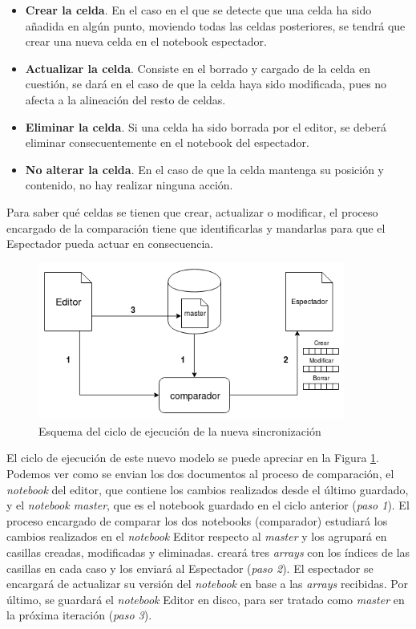 \documentclass[11pt,spanish,listoffigures,listoftables]{tfgetsinf}
\begin{document}
\begin{itemize}

\item \textbf{Crear la celda}. En el caso en el que se detecte que una celda ha sido añadida en algún punto, moviendo todas las celdas posteriores, se tendrá que crear una nueva celda en el notebook espectador.

\item \textbf{Actualizar la celda}. Consiste en el borrado y cargado de la celda en cuestión, se dará en el caso de que la celda haya sido modificada, pues no afecta a la alineación del resto de celdas.

\item \textbf{Eliminar la celda}. Si una celda ha sido borrada por el editor, se deberá eliminar consecuentemente en el notebook del espectador.

\item \textbf{No alterar la celda}. En el caso de que la celda mantenga su posición y contenido, no hay realizar ninguna acción.

\end{itemize}

Para saber qué celdas se tienen que crear, actualizar o modificar, el proceso encargado de la comparación tiene que identificarlas y mandarlas para que el Espectador pueda actuar en consecuencia. 

\begin{figure}[H]
	\centering
  	\includegraphics[width=0.9\textwidth]{nueva-sincro.png}
  	\caption{Esquema del ciclo de ejecución de la nueva sincronización}
  	\label{fig:new-sync}
\end{figure}

El ciclo de ejecución de este nuevo modelo se puede apreciar en la Figura \ref{fig:new-sync}. Podemos ver como se envian los dos documentos al proceso de comparación, el \textit{notebook} del editor, que contiene los cambios realizados desde el último guardado, y el \textit{notebook master}, que es el notebook guardado en el ciclo anterior (\textit{paso 1}). El proceso encargado de comparar los dos notebooks (comparador) estudiará los cambios realizados en el \textit{notebook} Editor respecto al \textit{master} y los agrupará en casillas creadas, modificadas y eliminadas. creará tres \textit{arrays} con los índices de las casillas en cada caso y los enviará al Espectador (\textit{paso 2}). El espectador se encargará de actualizar su versión del \textit{notebook} en base a las \textit{arrays} recibidas. Por último, se guardará el \textit{notebook} Editor en disco, para ser tratado como \textit{master} en la próxima iteración (\textit{paso 3}).
\end{document}
